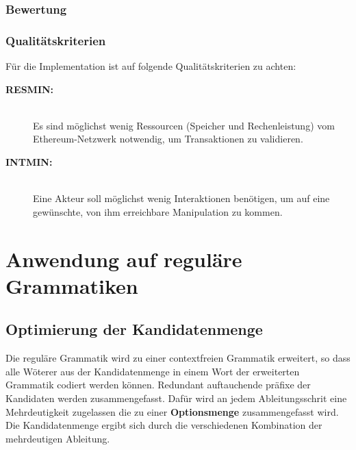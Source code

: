\documentclass[]{article}
\begin{document}
\subsubsection*{Bewertung}


\subsubsection*{Qualitätskriterien}

Für die Implementation ist auf folgende Qualitätskriterien zu achten:

\begin{description} 
  \item[\textbf{RESMIN:}]\hfill \\
    Es sind möglichst wenig Ressourcen (Speicher und Rechenleistung) vom Ethereum-Netzwerk notwendig, um Transaktionen zu validieren.
  \item[\textbf{INTMIN:}]\hfill \\
    Eine Akteur soll möglichst wenig Interaktionen benötigen, um auf eine gewünschte, von ihm erreichbare Manipulation zu kommen.
\end{description}

% 

% 





\section{Anwendung auf reguläre Grammatiken}

\subsection{Optimierung der Kandidatenmenge}
Die reguläre Grammatik wird zu einer contextfreien Grammatik erweitert, so dass alle Wöterer aus der Kandidatenmenge in einem Wort der erweiterten Grammatik codiert werden können. Redundant auftauchende präfixe der Kandidaten werden zusammengefasst. Dafür wird an jedem Ableitungsschrit eine Mehrdeutigkeit zugelassen die zu einer \textbf{Optionsmenge} zusammengefasst wird. Die Kandidatenmenge ergibt sich durch die verschiedenen Kombination der mehrdeutigen Ableitung.
\end{document}
